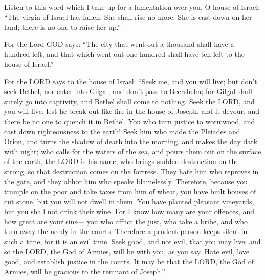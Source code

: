  Listen to this word which I take up for a lamentation
over you, O house of Israel:  ``The virgin of Israel has
fallen; She shall rise no more. She is cast down on her land; there is
no one to raise her up.''

 For the Lord GOD says: ``The city that went out a
thousand shall have a hundred left, and that which went out one hundred
shall have ten left to the house of Israel.''

 For the LORD says to the house of Israel: ``Seek me, and
you will live;  but don't seek Bethel, nor enter into
Gilgal, and don't pass to Beersheba; for Gilgal shall surely go into
captivity, and Bethel shall come to nothing.  Seek the
LORD, and you will live, lest he break out like fire in the house of
Joseph, and it devour, and there be no one to quench it in Bethel.
 You who turn justice to wormwood, and cast down
righteousness to the earth!  Seek him who made the
Pleiades and Orion, and turns the shadow of death into the morning, and
makes the day dark with night; who calls for the waters of the sea, and
pours them out on the surface of the earth, the LORD is his name,
 who brings sudden destruction on the strong, so that
destruction comes on the fortress.  They hate him who
reproves in the gate, and they abhor him who speaks blamelessly.
 Therefore, because you trample on the poor and take
taxes from him of wheat, you have built houses of cut stone, but you
will not dwell in them. You have planted pleasant vineyards, but you
shall not drink their wine.  For I know how many are your
offences, and how great are your sins--- you who afflict the just, who
take a bribe, and who turn away the needy in the courts. 
Therefore a prudent person keeps silent in such a time, for it is an
evil time.  Seek good, and not evil, that you may live;
and so the LORD, the God of Armies, will be with you, as you say.
 Hate evil, love good, and establish justice in the
courts. It may be that the LORD, the God of Armies, will be gracious to
the remnant of Joseph.''

